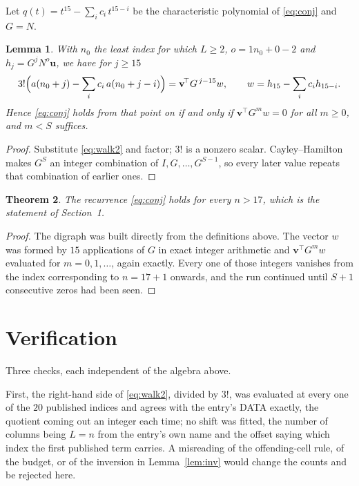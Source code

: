 \documentclass[11pt,a4paper]{article}
\theoremstyle{plain}
\newtheorem{theorem}{Theorem}
\newtheorem{lemma}[theorem]{Lemma}
\theoremstyle{definition}
\begin{document}
Let $q(t)=t^{15}-\sum_i c_i\,t^{15-i}$ be the characteristic polynomial of
\eqref{eq:conj} and $G=N$.

\begin{lemma}\label{lem:crit}
With $n_0$ the least index for which $L\ge2$, $o=1n_0+0-2$ and
$h_j=G^{j}N^{o}\mathbf{u}$, we have for $j\ge15$
\[
3!\Bigl(a(n_0+j)-\sum_i c_i\,a(n_0+j-i)\Bigr)=\mathbf{v}^{\!\top}G^{\,j-15}w,
\qquad w=h_{15}-\sum_i c_i h_{15-i} .
\]
Hence \eqref{eq:conj} holds from that point on if and only if
$\mathbf{v}^{\!\top}G^{m}w=0$ for all $m\ge0$, and $m<S$ suffices.
\end{lemma}

\begin{proof}
Substitute \eqref{eq:walk2} and factor; $3!$ is a nonzero scalar. Cayley--Hamilton
makes $G^{S}$ an integer combination of $I,G,\dots,G^{S-1}$, so every later value repeats
that combination of earlier ones.
\end{proof}

\begin{theorem}
The recurrence \eqref{eq:conj} holds for every $n>17$, which is the statement of
Section~1.
\end{theorem}

\begin{proof}
The digraph was built directly from the definitions above. The vector $w$ was formed by
$15$ applications of $G$ in exact integer arithmetic and $\mathbf{v}^{\!\top}G^{m}w$
evaluated for $m=0,1,\dots$, again exactly. Every one of those integers vanishes from the
index corresponding to $n=17+1$ onwards, and the run continued until $S+1$ consecutive
zeros had been seen.
\end{proof}

\section{Verification}

Three checks, each independent of the algebra above.

First, the right-hand side of \eqref{eq:walk2}, divided by $3!$, was evaluated at every
one of the $20$ published indices and agrees with the entry's DATA exactly, the quotient
coming out an integer each time; no shift was fitted, the number of columns being
$L=n$ from the entry's own name and the offset saying which index the first published
term carries. A misreading of the offending-cell rule, of the budget, or of the inversion in
Lemma~\ref{lem:inv} would change the counts and be rejected here.
\end{document}
